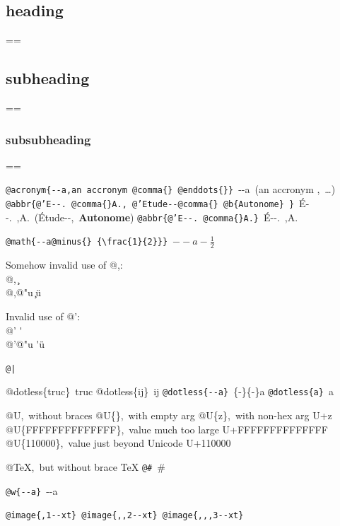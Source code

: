 \documentclass{book}
\makeatletter
\newenvironment{Texinfopreformatted}{%
  \par\GNUTobeylines\obeyspaces\frenchspacing\parskip=\z@\parindent=\z@}{}
{\catcode`\^^M=13 \gdef\GNUTobeylines{\catcode`\^^M=13 \def^^M{\null\par}}}
\newenvironment{Texinfoindented}{\begin{list}{}{}\item\relax}{\end{list}}
\renewcommand{\_}{\Texinfounderscore\discretionary{}{}{}}
\makeatother
\begin{document}
{{\begin{Texinfoindented}
\section*{{heading}}
\begin{Texinfopreformatted}%
\ttfamily 
\end{Texinfopreformatted}
\subsection*{{subheading}}
\begin{Texinfopreformatted}%
\ttfamily 
\end{Texinfopreformatted}
\subsubsection*{{subsubheading}}
\begin{Texinfopreformatted}%
\ttfamily 

\texttt{@acronym\{{-}{-}a,an accronym @comma\{\}\ @enddots\{\}\}}\ {-}{-}a\ (an accronym ,\ \dots{})
\texttt{@abbr\{@'E{-}{-}.\ @comma\{\}A.,\ @'Etude{-}{-}@comma\{\}\ @b\{Autonome\}\ \}}\ \'{E}{-}{-}.\@\ ,A.\@\ (\'{E}tude{-}{-},\ \textbf{Autonome})
\texttt{@abbr\{@'E{-}{-}.\ @comma\{\}A.\}}\ \'{E}{-}{-}.\@\ ,A.\@

\texttt{@math\{{-}{-}a@minus\{\}\ \{\textbackslash{}frac\{1\}\{2\}\}\}}\ $--a- {\frac{1}{2}}$




Somehow invalid use of @,:\leavevmode{}\\
@,\ \c{}\leavevmode{}\\
@,@"u \c{}\"{u}

Invalid use of @':\leavevmode{}\\
@' \'{}\leavevmode{}\\
@'@"u \'{}\"{u}

\texttt{@|}\ 

@dotless\{truc\}\ truc
@dotless\{ij\}\ ij
\texttt{@dotless\{{-}{-}a\}}\ \{-\}\{-\}a
\texttt{@dotless\{a\}}\ a

@U,\ without braces @U\{\},\ with empty arg 
@U\{z\},\ with non-hex arg U+z
@U\{FFFFFFFFFFFFFF\},\ value much too large U+FFFFFFFFFFFFFF
@U\{110000\},\ value just beyond Unicode U+110000

@TeX,\ but without brace \TeX{}
\texttt{@\#}\ \#

\texttt{@w\{{-}{-}a\}}\ \hbox{{-}{-}a}

\texttt{@image\{,1{-}{-}xt\}}\ 
\texttt{@image\{{,}{,}2{-}{-}xt\}}\ 
\texttt{@image\{{,}{,},3{-}{-}xt\}}\ 


\end{Texinfopreformatted}
\end{Texinfoindented}}}
\end{document}
